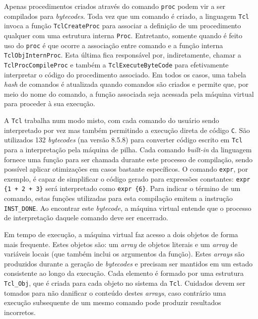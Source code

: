 Apenas procedimentos criados através do comando \verb!proc! podem vir
a ser compilados para \textit{bytecodes}. Toda vez que um comando é
criado, a linguagem \texttt{Tcl}
invoca a função \verb!TclCreateProc! para associar a definição de um
procedimento qualquer com uma
estrutura interna \verb!Proc!. Entretanto, somente quando é feito uso do
\verb!proc! é que ocorre a associação entre comando e a função interna
\verb!TclObjInternProc!. Esta
última fica responsável por, indiretamente, chamar a
\verb!TclProcCompileProc! e também a \verb!TclExecuteByteCode! para
efetivamente interpretar o código do procedimento associado.
 Em todos os casos, uma tabela \textit{hash}
de comandos é atualizada quando comandos são criados e permite que,
por meio do nome do comando, a função associada seja acessada pela
máquina virtual para proceder à sua execução.


A \texttt{Tcl} trabalha num modo misto, com cada comando do usuário sendo
interpretado por vez mas também permitindo a execução direta de código
\texttt{C}. São utilizados 132 \textit{bytecodes} (na versão 8.5.8)
para converter
código escrito em \texttt{Tcl} para a interpretação pela máquina de
pilha. Cada comando \textit{built-in} da linguagem fornece uma função
para ser chamada durante este processo de compilação, sendo possível
aplicar otimizações em casos bastante específicos. O comando
 \verb!expr!, por
exemplo, é capaz de simplificar o código gerado para expressões
constantes:
 \verb!expr {1 + 2 + 3}! será interpretado como \verb!expr {6}!.
 Para indicar o término de um comando, estas funções
utilizadas para esta compilação emitem a instrução
\verb!INST_DONE!. Ao encontrar este \textit{bytecode}, a máquina
virtual entende que o processo de interpretação daquele comando deve
ser encerrado.


Em tempo de execução, a máquina virtual faz acesso a dois objetos de
forma mais frequente. Estes objetos são: um \textit{array} de objetos
literais e um \textit{array} de variáveis locais (que também inclui os
argumentos da função). Estes \textit{arrays} são produzidos durante a
geração de \textit{bytecodes} e precisam ser mantidos em um estado
consistente ao longo da execução.
Cada elemento é formado por uma estrutura \verb!Tcl_Obj!,
que é criada para cada objeto no sistema da \texttt{Tcl}. Cuidados
devem ser tomados para não danificar o conteúdo destes
\textit{arrays}, caso contrário uma execução subsequente de um mesmo
comando pode produzir resultados incorretos.

